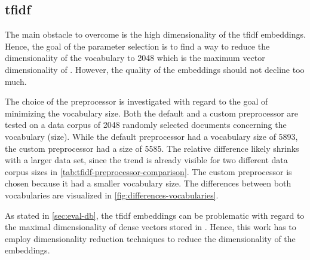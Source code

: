 \subsection*{\acs{tfidf}}\label{subsec:evaluation-tfidf}

The main obstacle to overcome is the high dimensionality of the \ac{tfidf} embeddings.
Hence, the goal of the parameter selection is to find a way to reduce the dimensionality of the vocabulary to 2048 
which is the maximum vector dimensionality of \databaseName{}.
However, the quality of the embeddings should not decline too much.

The choice of the preprocessor is investigated with regard to the goal of minimizing the vocabulary size.
Both the default and a custom preprocessor are tested on a data corpus of 2048 randomly selected documents concerning the vocabulary (size).
While the default preprocessor had a vocabulary size of 5893, the custom preprocessor had a size of 5585.
The relative difference likely shrinks with a larger data set, 
since the trend is already visible for two different data corpus sizes in \autoref{tab:tfidf-preprocessor-comparison}.
The custom preprocessor is chosen because it had a smaller vocabulary size.
The differences between both vocabularies are visualized in \autoref{fig:differences-vocabularies}.

As stated in \autoref{sec:eval-db}, the \ac{tfidf} embeddings can be problematic 
with regard to the maximal dimensionality of dense vectors stored in \databaseName{}.
Hence, this work has to employ dimensionality reduction techniques to reduce the dimensionality of the embeddings.


